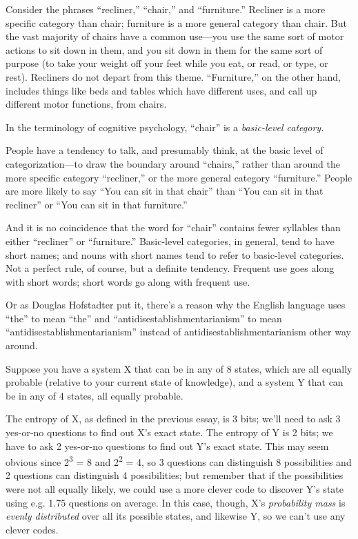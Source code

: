{
 Consider the phrases
``recliner,''
``chair,'' and
``furniture.'' Recliner is a more
specific category than chair; furniture is a more general category than
chair. But the vast majority of chairs have a common use---you use the
same sort of motor actions to sit down in them, and you sit down in
them for the same sort of purpose (to take your weight off your feet
while you eat, or read, or type, or rest). Recliners do not depart from
this theme. ``Furniture,'' on the
other hand, includes things like beds and tables which have different
uses, and call up different motor functions, from chairs.}

{
 In the terminology of cognitive psychology,
``chair'' is a \textit{basic-level
category.}}

{
 People have a tendency to talk, and presumably think, at the basic
level of categorization---to draw the boundary around
``chairs,'' rather than around the
more specific category ``recliner,''
or the more general category
``furniture.'' People are more
likely to say ``You can sit in that
chair'' than ``You can sit in that
recliner'' or ``You can sit in that
furniture.''}

{
 And it is no coincidence that the word for
``chair'' contains fewer syllables
than either ``recliner'' or
``furniture.'' Basic-level
categories, in general, tend to have short names; and nouns with short
names tend to refer to basic-level categories. Not a perfect rule, of
course, but a definite tendency. Frequent use goes along with short
words; short words go along with frequent use.}

{
 Or as Douglas Hofstadter put it, there's a reason
why the English language uses
``the'' to mean
``the'' and
``antidisestablishmentarianism'' to
mean
``antidisestablishmentarianism''
instead of antidisestablishmentarianism other way around.}

\myendsectiontext


{
 Suppose you have a system X that can be in any of 8 states, which
are all equally probable (relative to your current state of knowledge),
and a system Y that can be in any of 4 states, all equally probable. }

{
 The entropy of X, as defined in the previous essay, is 3 bits;
we'll need to ask 3 yes-or-no questions to find out
X's exact state. The entropy of Y is 2 bits; we have to
ask 2 yes-or-no questions to find out Y's exact state.
This may seem obvious since 2\textsuperscript{3} = 8 and
2\textsuperscript{2} = 4, so 3 questions can distinguish 8
possibilities and 2 questions can distinguish 4 possibilities; but
remember that if the possibilities were not all equally likely, we
could use a more clever code to discover Y's state
using e.g. 1.75 questions on average. In this case, though,
X's \textit{probability mass} is \textit{evenly
distributed} over all its possible states, and likewise Y, so we
can't use any clever codes.}

